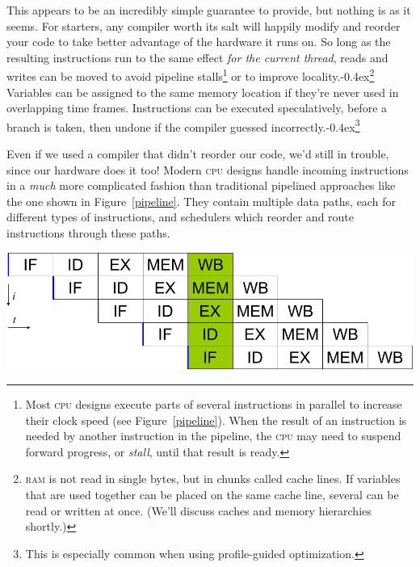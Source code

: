 \documentclass[fontsize=10pt, numbers=endperiod]{scrartcl}
\newcommand{\punckern}{\kern-0.4ex}
\newcommand{\cpp}[1]{C\kern-0.1ex\raisebox{0.15ex}{\texttt{++}}{\addfontfeature{Numbers=LowercaseOff}#1}}
\newcommand{\fig}[1]{Figure~\ref{#1}}
\newcommand{\introduce}[1]{\textit{#1}}
\newenvironment{colfigure}
  {\par\vspace{1\baselineskip minus 0.5\baselineskip}\noindent\minipage{\linewidth}}
  {\endminipage\vspace*{1\baselineskip minus 0.7\baselineskip}}
\begin{document}
\begin{multicols}{2}
This appears to be an incredibly simple guarantee to provide,
but nothing is as it seems.
For starters, any compiler worth its salt will
happily modify and reorder your code to take better advantage of the hardware
it runs on.
So long as the resulting instructions run to the same effect
\emph{for the current thread},
reads and writes can be moved to avoid pipeline stalls\footnote{%
Most \textsc{cpu} designs execute parts of several instructions in parallel
to increase their clock speed (see \fig{pipeline}).
When the result of an instruction is needed by
another instruction in the pipeline, the \textsc{cpu} may need
to suspend forward progress, or \introduce{stall}, until that result is ready.}
or to improve locality.\punckern\footnote{%
\textsc{ram} is not read in single bytes, but in chunks called cache lines.
If variables that are used together can be placed on the same cache line,
several can be read or written at once.
(We'll discuss caches and memory hierarchies shortly.)}
Variables can be assigned to the same memory location if they're never used
in overlapping time frames.
Instructions can be executed speculatively, before a branch is taken,
then undone if the compiler guessed incorrectly.\punckern\footnote{This is
especially common when using profile-guided optimization.}

Even if we used a compiler that didn't reorder our code,
we'd still in trouble, since our hardware does it too!
Modern \textsc{cpu} designs handle incoming instructions in
a \emph{much} more complicated fashion than traditional pipelined approaches
like the one shown in \fig{pipeline}.
They contain multiple data paths, each for different types of instructions,
and schedulers which reorder and route instructions through these paths.
\begin{colfigure}
\centering
\includegraphics[keepaspectratio,width=0.7\linewidth]{pipeline}
\label{pipeline}
\end{colfigure}


\end{multicols}
\end{document}
